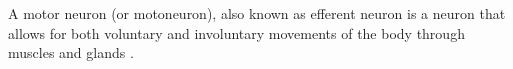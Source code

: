 \documentclass[a4paper]{article}
\title{}
\date{}
\author{Mohammad Rahmani}
\begin{document}
    \maketitle
    A motor neuron (or motoneuron), also known as efferent neuron is a neuron that allows for both voluntary and involuntary movements of the body through muscles and glands .
    
    
    
    
\end{document}
